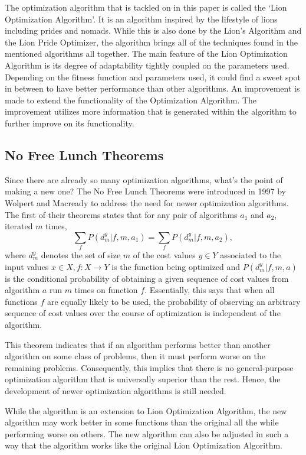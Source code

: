 \par The optimization algorithm that is tackled on in this paper is called the `Lion Optimization Algorithm'. It is an algorithm inspired by the lifestyle of lions including prides and nomads. While this is also done by the Lion's Algorithm and the Lion Pride Optimizer, the algorithm brings all of the techniques found in the mentioned algorithms all together. The main feature of the Lion Optimization Algorithm is its degree of adaptability tightly coupled on the parameters used. Depending on the fitness function and parameters used, it could find a sweet spot in between to have better performance than other algorithms. An improvement is made to extend the functionality of the Optimization Algorithm. The improvement utilizes more information that is generated within the algorithm to further improve on its functionality.

\subsection{No Free Lunch Theorems}
\par Since there are already so many optimization algorithms, what's the point of making a new one? The No Free Lunch Theorems were introduced in 1997 by Wolpert and Macready to address the need for newer optimization algorithms. The first of their theorems states that for any pair of algorithms $a_1$ and $a_2$, iterated $m$ times, $$ \sum_{f} P(d_{m}^{y}|f,m,a_1)=\sum_{f} P(d_{m}^{y}|f,m,a_2),$$ where $d_m^y$ denotes the set of size $m$ of the cost values $y\in Y$ associated to the input values $x\in X,f:X\to Y$ is the function being optimized and $P(d_m^y|f,m,a)$ is the conditional probability of obtaining a given sequence of cost values from algorithm $a$ run $m$ times on function $f$. Essentially, this says that when all functions $f$ are equally likely to be used, the probability of observing an arbitrary sequence of cost values over the course of optimization is independent of the algorithm.

\par This theorem indicates that if an algorithm performs better than another algorithm on some class of problems, then it must perform worse on the remaining problems. Consequently, this implies that there is no general-purpose optimization algorithm that is universally superior than the rest. Hence, the development of newer optimization algorithms is still needed.

\par While the algorithm is an extension to Lion Optimization Algorithm, the new algorithm may work better in some functions than the original all the while performing worse on others. The new algorithm can also be adjusted in such a way that the algorithm works like the original Lion Optimization Algorithm.


